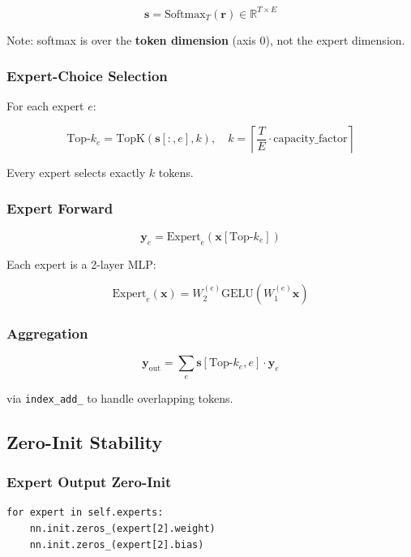 \[
\mathbf{s} = \text{Softmax}_T(\mathbf{r}) \in \mathbb{R}^{T \times E}
\tag{4.8}
\]

Note: softmax is over the \textbf{token dimension} (axis 0), not the expert 
dimension.

\subsubsection{Expert-Choice Selection}

For each expert $e$:

\[
\text{Top-}k_e = \text{TopK}\!\left(\mathbf{s}[:, e], k\right), \quad
k = \left\lceil \frac{T}{E} \cdot \text{capacity\_factor} \right\rceil
\tag{4.9}
\]

Every expert selects exactly $k$ tokens.

\subsubsection{Expert Forward}

\[
\mathbf{y}_e = \text{Expert}_e\!\left(\mathbf{x}[\text{Top-}k_e]\right)
\tag{4.10}
\]

Each expert is a 2-layer MLP:

\[
\text{Expert}_e(\mathbf{x}) = W_2^{(e)} \text{GELU}(W_1^{(e)} \mathbf{x})
\tag{4.11}
\]

\subsubsection{Aggregation}

\[
\mathbf{y}_{\text{out}} = \sum_e \mathbf{s}[\text{Top-}k_e, e] \cdot \mathbf{y}_e
\tag{4.12}
\]

via \texttt{index\_add\_} to handle overlapping tokens.

\subsection{Zero-Init Stability}

\subsubsection{Expert Output Zero-Init}

\begin{lstlisting}
for expert in self.experts:
    nn.init.zeros_(expert[2].weight)
    nn.init.zeros_(expert[2].bias)
\end{lstlisting}

